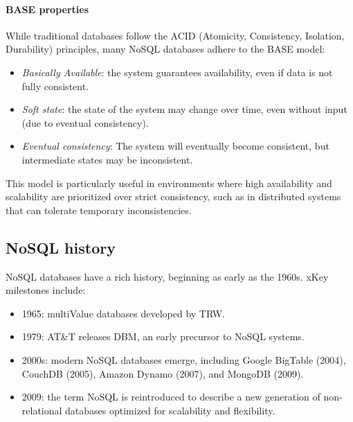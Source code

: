 \paragraph*{BASE properties}
While traditional databases follow the ACID (Atomicity, Consistency, Isolation, Durability) principles, many NoSQL databases adhere to the BASE model:
\begin{itemize}
    \item \textit{Basically Available}: the system guarantees availability, even if data is not fully consistent.
    \item \textit{Soft state}: the state of the system may change over time, even without input (due to eventual consistency).
    \item \textit{Eventual consistency}: The system will eventually become consistent, but intermediate states may be inconsistent.
\end{itemize}
This model is particularly useful in environments where high availability and scalability are prioritized over strict consistency, such as in distributed systems that can tolerate temporary inconsistencies.

\subsection{NoSQL history}
NoSQL databases have a rich history, beginning as early as the 1960s. 
xKey milestones include:
\begin{itemize}
    \item 1965: multiValue databases developed by TRW.
    \item 1979: AT\&T releases DBM, an early precursor to NoSQL systems.
    \item 2000s: modern NoSQL databases emerge, including Google BigTable (2004), CouchDB (2005), Amazon Dynamo (2007), and MongoDB (2009).
    \item 2009: the term NoSQL is reintroduced to describe a new generation of non-relational databases optimized for scalability and flexibility.
\end{itemize}

